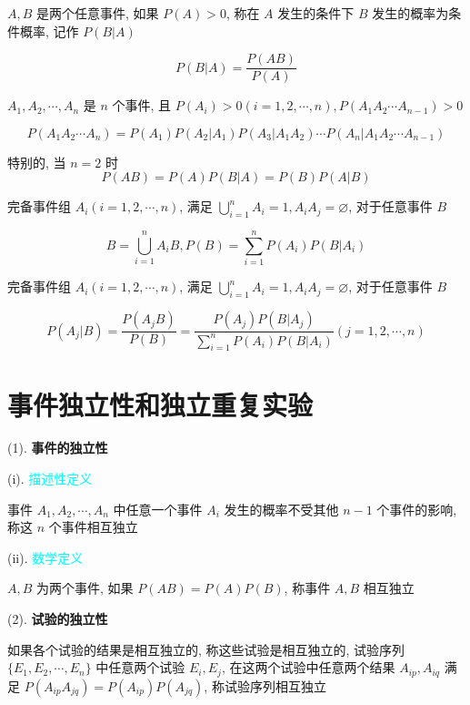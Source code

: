 \begin{theorem}[条件概率公式]
	$A, B$ 是两个任意事件, 如果 $P(A)>0$, 称在 $A$ 发生的条件下 $B$ 发生的概率为条件概率, 记作 $P(B\big|A)$
	
	$$P(B\big|A) = \dfrac{P(AB)}{P(A)}$$
\end{theorem}
\begin{theorem}[乘法公式]
	$A_{1}, A_{2}, \cdots, A_{n}$ 是 $n$ 个事件, 且 $P(A_{i})>0(i = 1,2,\cdots,n), P(A_{1}A_{2}\cdots A_{n-1})>0$

	$$P(A_{1}A_{2}\cdots A_{n}) = P(A_{1})P(A_{2}\big|A_{1})P(A_{3}\big|A_{1}A_{2})\cdots P(A_{n}\big|A_{1}A_{2}\cdots A_{n-1})$$
	
	特别的, 当 $n = 2$ 时 
	$$P(AB) = P(A)P(B\big|A) = P(B)P(A\big|B)$$
\end{theorem}
\begin{theorem}[全概率公式]
	完备事件组 $A_{i}(i = 1, 2, \cdots, n)$, 满足 $\bigcup_{i = 1}^{n}A_{i} = 1, A_{i}A_{j} = \varnothing$, 对于任意事件 $B$ 
	
	$$B = \bigcup_{i = 1}^{n}A_{i}B, P(B) = \sum\limits_{i = 1}^{n}P(A_{i})P(B\big|A_{i})$$
\end{theorem}
\begin{theorem}[贝叶斯公式]
	完备事件组 $A_{i}(i = 1,2,\cdots,n)$, 满足 $\bigcup_{i = 1}^{n}A_{i} = 1, A_{i}A_{j} = \varnothing$, 对于任意事件 $B$

	$$P(A_{j}\big|B) = \dfrac{P(A_{j}B)}{P(B)} = \dfrac{P(A_{j})P(B\big|A_{j})}{\sum\limits_{i = 1}^{n}P(A_{i})P(B\big|A_{i})} (j = 1, 2, \cdots, n)$$
\end{theorem}

\section{事件独立性和独立重复实验}

\begin{definition}[独立性]
	(1). \textbf{事件的独立性}
	
	(i). \textcolor{cyan}{描述性定义}
	
	事件 $A_{1}, A_{2}, \cdots, A_{n}$ 中任意一个事件 $A_{i}$ 发生的概率不受其他 $n-1$ 个事件的影响, 称这 $n$ 个事件相互独立
	
	(ii). \textcolor{cyan}{数学定义}
	
	$A,B$ 为两个事件, 如果 $P(AB) = P(A)P(B)$, 称事件 $A,B$ 相互独立
	
	(2). \textbf{试验的独立性}
	
	如果各个试验的结果是相互独立的, 称这些试验是相互独立的, 试验序列 $\{E_{1}, E_{2}, \cdots, E_{n}\}$ 中任意两个试验 $E_{i}, E_{j}$,
	在这两个试验中任意两个结果 $A_{ip}, A_{iq}$ 满足 $P(A_{ip}A_{jq}) = P(A_{ip})P(A_{jq})$, 称试验序列相互独立
\end{definition}


